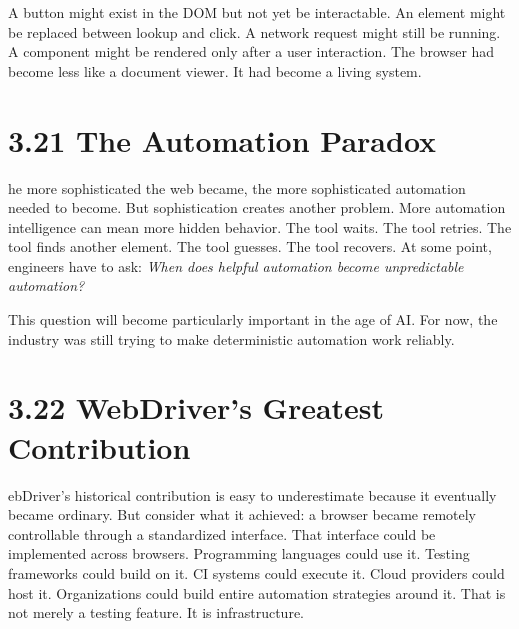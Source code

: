 \documentclass[11pt, a4paper, openany]{book}
\newcommand{\initialcap}[1]{{\fontfamily{lmss}\selectfont\huge\textbf{#1}}}
\begin{document}
A button might exist in the DOM but not yet be interactable. An element might be replaced between lookup and click. A network request might still be running. A component might be rendered only after a user interaction. The browser had become less like a document viewer. It had become a living system.

\section{3.21 The Automation Paradox}
\noindent \initialcap{T}he more sophisticated the web became, the more sophisticated automation needed to become. But sophistication creates another problem. More automation intelligence can mean more hidden behavior. The tool waits. The tool retries. The tool finds another element. The tool guesses. The tool recovers. At some point, engineers have to ask: \textit{When does helpful automation become unpredictable automation?}

This question will become particularly important in the age of AI. For now, the industry was still trying to make deterministic automation work reliably.

\section{3.22 WebDriver's Greatest Contribution}
\noindent \initialcap{W}ebDriver's historical contribution is easy to underestimate because it eventually became ordinary. But consider what it achieved: a browser became remotely controllable through a standardized interface. That interface could be implemented across browsers. Programming languages could use it. Testing frameworks could build on it. CI systems could execute it. Cloud providers could host it. Organizations could build entire automation strategies around it. That is not merely a testing feature. It is infrastructure.
\end{document}

